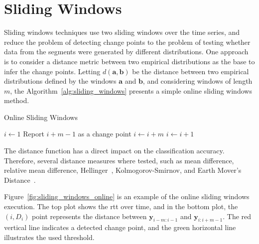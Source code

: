 \section{Sliding Windows}

Sliding windows techniques use two sliding windows over the time series, and
reduce the problem of detecting change points to the problem of testing whether
data from the segments were generated by different distributions. One approach
is to consider a distance metric between two empirical distributions as the base
to infer the change points. Letting $d(\mathbf{a}, \mathbf{b})$ be the distance
between two empirical distributions defined by the windows $\mathbf{a}$ and
$\mathbf{b}$, and considering windows of length $m$, the
Algorithm~\ref{alg:sliding_windows} presents a simple online sliding windows
method.

\begin{algorithm}[H]
\caption{Online Sliding Windows}
\label{alg:sliding_windows}
    \begin{algorithmic}[1]
        \State{} $i \gets 1$
                \State{} Report $i + m - 1$ as a change point
                \State{} $i \gets i + m$
             \Else{}
                \State{} $i \gets i + 1$
             \EndIf{}
        \EndWhile{}
    \end{algorithmic}
\end{algorithm}

The distance
function has a direct impact on the classification accuracy.
Therefore, several
distance measures where tested, such as mean difference, relative mean
difference,
Hellinger~\cite{hellinger_distance}, Kolmogorov-Smirnov, and
Earth Mover's
Distance~\cite{the_earth_movers_distance_as_a_metric_for_image_retrieval}.

Figure~\ref{fig:sliding_windows_online} is an example of the online sliding
windows execution. The top plot
shows the \gls*{rtt} over time, and in
the bottom plot, the $(i, D_{i})$ point represents the distance between
$\mathbf{y}_{i - m : i - 1}$ and $\mathbf{y}_{i : i + m - 1}$. The red vertical
line indicates a detected change point, and the green horizontal line
illustrates the used threshold.

